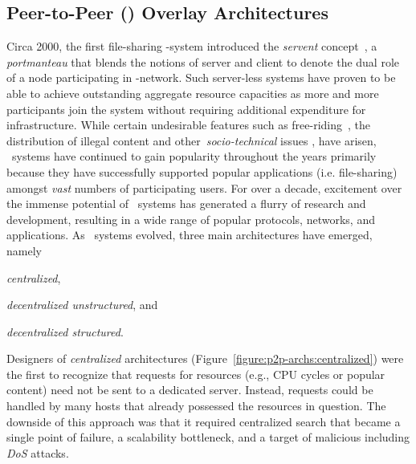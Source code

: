 \subsection{Peer-to-Peer (\p) Overlay Architectures}
Circa 2000, the first file-sharing \p-system introduced the \emph{servent}
concept~\cite{gnutella}, a \emph{portmanteau} that blends the notions of server
and client to denote the dual role of a node participating in \p-network. 
Such server-less systems have proven to be able to achieve outstanding
aggregate resource capacities as more and more participants join the system
without requiring additional expenditure for infrastructure. 
While certain undesirable features such as 
free-riding~\cite{saroiu_measurefileshare_2002,adar_gnutellafreeriders_2000,hughes_gnutellafreeride_2005},
the distribution of illegal content and other~\emph{socio-technical}
issues \cite{hughes_socp2p_2008}, have arisen, \p\ systems have
continued to gain popularity throughout the years primarily 
because they have successfully supported popular applications 
(i.e. file-sharing) amongst \emph{vast} numbers of participating users.
For over a decade, excitement over the immense potential of \p\ systems has
generated a flurry of research and development, resulting in a wide range of
popular protocols, networks, and applications. As \p\ systems evolved, three
main architectures have emerged, namely
\begin{inparaenum}
  \item \emph{centralized},
  \item \emph{decentralized unstructured}, and
  \item \emph{decentralized structured}.
\end{inparaenum}

Designers of \emph{centralized} architectures 
(Figure~\ref{figure:p2p-archs:centralized}) were the first 
to recognize that requests for resources 
(e.g., CPU cycles or popular content) need not be sent to
a dedicated server. Instead, requests could be handled by 
many hosts that already possessed the resources in question. 
The downside of this approach was that it required 
centralized search that became a single point of failure, a
scalability bottleneck, and a target of malicious including \emph{DoS} attacks. 

